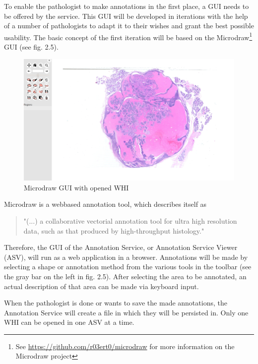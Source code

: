 To enable the pathologist to make annotations in the first place, a GUI needs to be offered by the service. This GUI will be developed in iterations with the help of a number of pathologists to adapt it to their wishes and grant the best possible usability. The basic concept of the first iteration will be based on the Microdraw\footnote{See \url{https://github.com/r03ert0/microdraw} for more information on the Microdraw project} GUI (see fig. 2.5).

\begin{figure}[H]
	\begin{center}
		\includegraphics[scale=0.2]{img/microdrawUI.png}
		\caption{Microdraw GUI with opened WHI}
		\label{fig:fig2.5}
	\end{center}
\end{figure}

Microdraw is a webbased annotation tool, which describes itself as

\begin{quotation}
"(...) a collaborative vectorial annotation tool for ultra high resolution data, such as that produced by high-throughput histology." \cite{web:microdraw}
\end{quotation}

Therefore, the GUI of the Annotation Service, or Annotation Service Viewer (ASV), will run as a web application in a browser. Annotations will be made by selecting a shape or annotation method from the various tools in the toolbar (see the gray bar on the left in fig. 2.5). After selecting the area to be annotated, an actual description of that area can be made via keyboard input.

When the pathologist is done or wants to save the made annotations, the Annotation Service will create a file in which they will be persisted in. Only one WHI can be opened in one ASV at a time.


